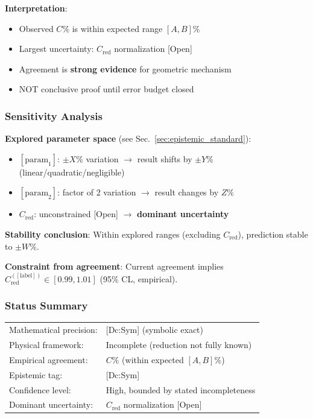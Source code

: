 \textbf{Interpretation}:
\begin{itemize}
\item Observed $C\%$ is within expected range $[A, B]\%$
\item Largest uncertainty: $C_{\mathrm{red}}$ normalization [Open]
\item Agreement is \textbf{strong evidence} for geometric mechanism
\item NOT conclusive proof until error budget closed
\end{itemize}


\subsubsection{Sensitivity Analysis}

\textbf{Explored parameter space} (see Sec.~\ref{sec:epistemic_standard}):

\begin{itemize}
\item $[\text{param}_1]$: $\pm X\%$ variation
  $\to$ result shifts by $\pm Y\%$ (linear/quadratic/negligible)
\item $[\text{param}_2]$: factor of 2 variation
  $\to$ result changes by $Z\%$
\item $C_{\mathrm{red}}$: unconstrained [Open]
  $\to$ \textbf{dominant uncertainty}
\end{itemize}

\textbf{Stability conclusion}:
Within explored ranges (excluding $C_{\mathrm{red}}$), prediction stable to $\pm W\%$.

\textbf{Constraint from agreement}:
Current agreement implies $C_{\mathrm{red}}^{([\text{label}])} \in [0.99, 1.01]$ (95\% CL, empirical).


\subsubsection{Status Summary}

\begin{tabular}{ll}
\hline
Mathematical precision: & [Dc:Sym] (symbolic exact) \\
Physical framework: & Incomplete (reduction not fully known) \\
Empirical agreement: & $C\%$ (within expected $[A, B]\%$) \\
Epistemic tag: & [Dc:Sym] \\
Confidence level: & High, bounded by stated incompleteness \\
Dominant uncertainty: & $C_{\mathrm{red}}$ normalization [Open] \\
\hline
\end{tabular}

